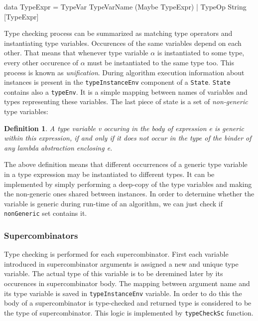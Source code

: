 \documentclass[12pt,a4paper]{report}
\newtheorem{definition}{Definition}[chapter]
\begin{document}
\vspace*{0.2in}
\begin{code}
data TypeExpr = TypeVar TypeVarName (Maybe TypeExpr)
              | TypeOp String [TypeExpr]
\end{code}

Type checking process can be summarized as matching type operators and
instantiating type variables. Occurences of the same variables depend on each
other. That means that whenever type variable $\alpha$ is instantiated to some
type, every other occurence of $\alpha$ must be instantiated to the same type
too. This process is known as \textit{unification}. During algorithm execution
information about instances is present in the \texttt{typeInstanceEnv}
component of a \texttt{State}. \texttt{State} contains also a \texttt{typeEnv}.
It is a simple mapping between names of variables and types representing these
variables. The last piece of state is a set of \textit{non-generic} type
variables:

\begin{definition}
  A type variable v occuring in the body of expression e is generic within this
  expression, if and only if it does not occur in the type of the binder of any
  lambda abstraction enclosing e.
\end{definition}

The above definition means that different occurrences of a generic type
variable in a type expression may be instantiated to different types. It can be
implemented by simply performing a deep-copy of the type variables and making
the non-generic ones shared between instances. In order to determine whether
the variable is generic during run-time of an algorithm, we can just check if
\texttt{nonGeneric} set contains it.

\subsubsection{Supercombinators}
Type checking is performed for each supercombinator. First each variable
introduced in supercombinator arguments is assigned a new and unique type
variable. The actual type of this variable is to be deremined later by its
occurences in supercombinator body. The mapping between argument name and its
type variable is saved in \texttt{typeInstanceEnv} variable. In order to do
this the body of a supercombinator is type-checked and returned type is
considered to be the type of supercombinator. This logic is implemented by
\texttt{typeCheckSc} function.
\end{document}
